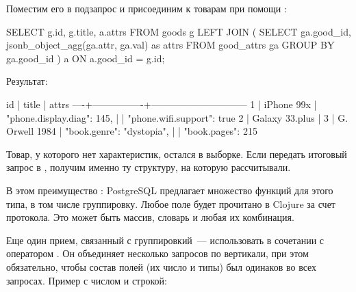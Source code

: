 Поместим его в подзапрос и присоединим к товарам при помощи :

\begin{english}
  \begin{sql}
SELECT
  g.id,
  g.title,
  a.attrs
FROM
  goods g
LEFT JOIN (
  SELECT
    ga.good_id,
    jsonb_object_agg(ga.attr, ga.val) as attrs
  FROM good_attrs ga
    GROUP BY ga.good_id
) a ON a.good_id = g.id;
  \end{sql}
\end{english}

Результат:


\begin{english}
  \begin{text}
 id |     title      |             attrs
----+----------------+------------------------------
  1 | iPhone 99x     | {"phone.display.diag": 145,
    |                |  "phone.wifi.support": true}
  2 | Galaxy 33.plus |
  3 | G. Orwell 1984 | {"book.genre": "dystopia",
    |                |  "book.pages": 215}
  \end{text}
\end{english}

Товар, у которого нет характеристик, остался в выборке. Если передать итоговый запрос в , получим именно ту структуру, на которую рассчитывали.

В этом преимущество : PostgreSQL предлагает множество функций для этого типа, в том числе группировку. Любое поле  будет прочитано в Clojure за счет протокола. Это может быть массив, словарь и любая их комбинация.

Еще один прием, связанный с группировкий~--- использовать  в сочетании с оператором . Он объединяет несколько запросов по вертикали, при этом обязательно, чтобы состав полей (их число и типы) был одинаков во всех запросах. Пример с числом и строкой:

